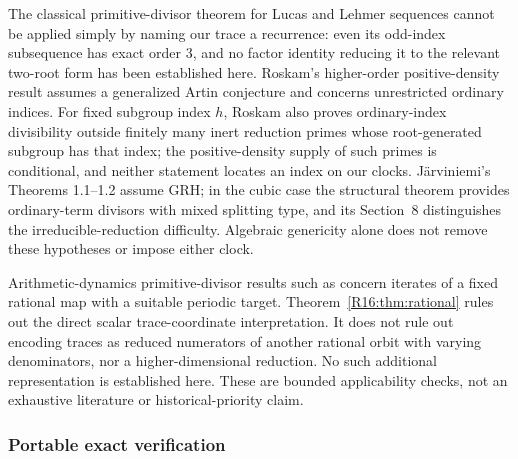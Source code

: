 \documentclass[11pt,a4paper]{article}
\theoremstyle{definition}\newtheorem{definition}[theorem]{Definition}
\theoremstyle{remark}\newtheorem{remark}[theorem]{Remark}
\begin{document}
The classical primitive-divisor theorem for Lucas and Lehmer sequences
\cite[Theorem 1.4]{R16-BHV} cannot be applied simply by naming our trace a
recurrence: even its odd-index subsequence has exact order $3$, and no
factor identity reducing it to the relevant two-root form has been
established here. Roskam's higher-order positive-density result
\cite{R16-Roskam} assumes a generalized Artin conjecture and concerns
unrestricted ordinary indices. For fixed subgroup index $h$, Roskam
also proves ordinary-index divisibility outside finitely many inert
reduction primes whose root-generated subgroup has that index; the
positive-density supply of such primes is conditional, and neither
statement locates an index on our clocks. J\"arviniemi's Theorems 1.1--1.2
\cite{R16-Jarviniemi} assume GRH; in the cubic case the structural theorem
provides ordinary-term divisors with mixed splitting type, and its
Section~8 distinguishes the irreducible-reduction difficulty. Algebraic
genericity alone does not remove these hypotheses or impose either clock.

Arithmetic-dynamics primitive-divisor results such as
\cite{R16-IngramSilverman} concern iterates of a fixed rational map with a
suitable periodic target. Theorem~\ref{R16:thm:rational} rules out the direct
scalar trace-coordinate interpretation. It does not rule out encoding
traces as reduced numerators of another rational orbit with varying
denominators, nor a higher-dimensional reduction. No such additional
representation is established here. These are bounded applicability checks,
not an exhaustive literature or historical-priority claim.

\subsubsection{Portable exact verification}
\end{document}
